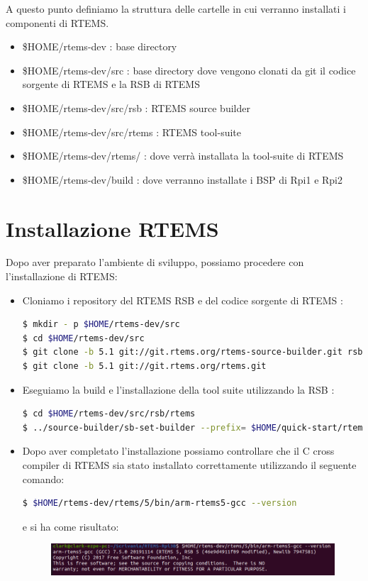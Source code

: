 \documentclass[10pt, a4paper]{article}
\begin{document}
\begin{flushleft}
A questo punto definiamo la struttura delle cartelle in cui verranno installati i componenti di RTEMS.

\begin{itemize}
\item \$HOME/rtems-dev  : base directory
\item \$HOME/rtems-dev/src : base directory dove vengono clonati da git il codice sorgente di RTEMS e la RSB di RTEMS
\item \$HOME/rtems-dev/src/rsb : RTEMS source builder
\item \$HOME/rtems-dev/src/rtems : RTEMS tool-suite
\item \$HOME/rtems-dev/rtems/ : dove verrà installata la tool-suite di RTEMS 
\item \$HOME/rtems-dev/build : dove verranno installate i BSP di Rpi1 e Rpi2
\end{itemize}
\newpage
\section{Installazione RTEMS}

Dopo aver preparato l'ambiente di sviluppo, possiamo procedere con l'installazione di RTEMS:
\begin{itemize}

\item Cloniamo i repository del RTEMS RSB e del codice sorgente di RTEMS : 
\begin{lstlisting}[language=bash] 
$ mkdir - p $HOME/rtems-dev/src
$ cd $HOME/rtems-dev/src
$ git clone -b 5.1 git://git.rtems.org/rtems-source-builder.git rsb
$ git clone -b 5.1 git://git.rtems.org/rtems.git
\end{lstlisting}

\item Eseguiamo la build e l'installazione della tool suite utilizzando la RSB :
\begin{lstlisting}[language=bash] 
$ cd $HOME/rtems-dev/src/rsb/rtems
$ ../source-builder/sb-set-builder --prefix= $HOME/quick-start/rtems/5 5/rtems-arm
\end{lstlisting}

\item Dopo aver completato l'installazione possiamo controllare che il C cross compiler di RTEMS sia stato installato correttamente utilizzando il seguente comando: 
\begin{lstlisting}[language=bash] 
$ $HOME/rtems-dev/rtems/5/bin/arm-rtems5-gcc --version
\end{lstlisting}	
e si ha come risultato:
\begin{figure}[h!]
\includegraphics[width=\linewidth]{rtems-gcc-version.png}
\end{figure}


\end{itemize}
\end{flushleft}
\end{document}
